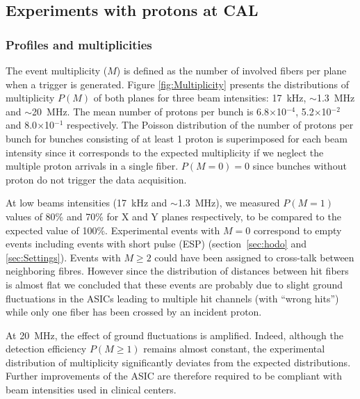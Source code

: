 \documentclass[a4paper,11pt]{article}
\begin{document}
\subsection{Experiments with protons at CAL}
\subsubsection{Profiles and multiplicities}
\label{Profiles_And_Multiplies}

The event multiplicity ($M$) is defined as the number of involved fibers per plane when a trigger is generated. Figure \ref{fig:Multiplicity} presents the distributions of multiplicity $P(M)$ of both planes for three beam intensities: 17~kHz, $\sim$1.3~MHz and $\sim$20~MHz. The mean number of protons per bunch is 6.8$\times$10$^{-4}$, 5.2$\times$10$^{-2}$ and 8.0$\times$10$^{-1}$ respectively. The Poisson distribution of the number of protons per bunch for bunches consisting of at least 1 proton is superimposed for each beam intensity since it corresponds to the expected multiplicity if we neglect the multiple proton arrivals in a single fiber. $P(M=0)=0$ since bunches without proton do not trigger the data acquisition. 

At low beams intensities (17~kHz and $\sim$1.3~MHz), we measured $P(M=1)$ values of 80\% and 70\% for X and Y planes respectively, to be compared to the expected value of 100\%. Experimental events with $M=0$ correspond to empty events including events with short pulse (ESP) (section~\ref{sec:hodo} and \ref{sec:Settings}). Events with $M\ge2$ could have been assigned to cross-talk between neighboring fibres. However since the distribution of distances between hit fibers is almost flat we concluded that these events are probably due to slight ground fluctuations in the ASICs leading to multiple hit channels (with “wrong hits”) while only one fiber has been crossed by an incident proton. 

At 20~MHz, the effect of ground fluctuations is amplified. Indeed, although the detection efficiency $P(M\ge1)$ remains almost constant, the experimental distribution of multiplicity significantly deviates from the expected distributions. Further improvements of the ASIC are therefore required to be compliant with beam intensities used in clinical centers.
\end{document}
